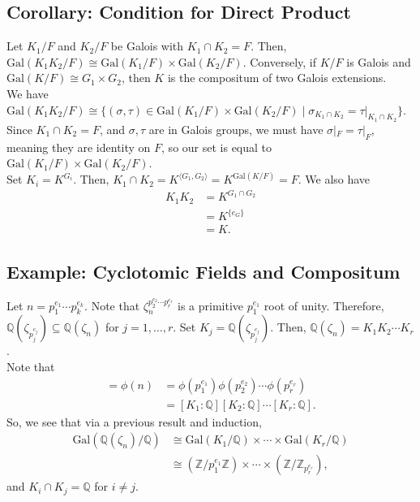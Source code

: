 \documentclass[10pt]{extarticle}
\newcommand{\Q}{\mathbb{Q}}
\newcommand{\Z}{\mathbb{Z}}
\begin{document}
  \subsection{Corollary: Condition for Direct Product}%
  Let $K_1/F$ and $K_2/F$ be Galois with $K_1\cap K_2 = F$. Then, $\text{Gal}(K_1K_2/F) \cong \text{Gal}(K_1/F)\times \text{Gal}(K_2/F)$. Conversely, if $K/F$ is Galois and $\text{Gal}(K/F) \cong G_1\times G_2$, then $K$ is the compositum of two Galois extensions.\\

  We have $\text{Gal}(K_1K_2/F)\cong \{(\sigma,\tau)\in \text{Gal}(K_1/F)\times \text{Gal}(K_2/F)\mid \sigma_{K_1\cap K_2} = \tau|_{K_1\cap K_2}\}$. Since $K_1 \cap K_2 = F$, and $\sigma,\tau$ are in Galois groups, we must have $\sigma|_{F} = \tau|_{F}$, meaning they are identity on $F$, so our set is equal to $\text{Gal}(K_1/F)\times \text{Gal}(K_2/F)$.\\

  Set $K_i = K^{G_i}$. Then, $K_1\cap K_2 = K^{\langle G_1,G_2\rangle} = K^{\text{Gal}(K/F)} = F$. We also have
  \begin{align*}
    K_1K_2 &= K^{G_1\cap G_2}\\
           &= K^{\{e_G\}}\\
           &= K.
  \end{align*}
  \subsection{Example: Cyclotomic Fields and Compositum}%
  Let $n = p_1^{e_1}\cdots p_k^{e_k}$. Note that $\zeta_n^{p_2^{e_2}\cdots p_r^{e_r}}$ is a primitive $p_1^{e_1}$ root of unity. Therefore, $\Q\left(\zeta_{p_j^{e_j}}\right) \subseteq \Q(\zeta_n)$ for $j=1,\dots,r$. Set $K_j = \Q\left(\zeta_{p_j^{e_j}}\right)$. Then, $\Q(\zeta_n) = K_1K_2\cdots K_r$.\\

  Note that
  \begin{align*}
    [\Q(\zeta_n):\Q] = \phi(n) &= \phi\left(p_1^{e_1}\right)\phi\left(p_2^{e_2}\right) \cdots \phi\left(p_r^{e_r}\right)\\
                               &= [K_1:\Q][K_2:\Q]\cdots[K_r:\Q].
  \end{align*}
  So, we see that via a previous result and induction,
  \begin{align*}
    \text{Gal}\left(\Q(\zeta_n)/\Q\right) &\cong \text{Gal}(K_1/\Q)\times \cdots\times \text{Gal}(K_r/\Q)\\
                                          &\cong \left(\Z/p_1^{e_1}\Z\right)\times \cdots \times \left(\Z/\Z_{p_r^{e_r}}\right),
  \end{align*}
  and $K_i\cap K_j = \Q$ for $i\neq j$.
\end{document}
